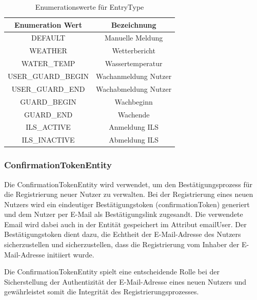 \documentclass[fontsize=12pt,openright,oneside,paper=a4,BCOR=1cm]{scrbook}
\begin{document}
\begin{table}[ht]
\centering
\caption{Enumerationswerte für \glqq EntryType\grqq{}}
\label{tab:entrytype}
\begin{tabular}{|c|c|}
\hline
Enumeration Wert & Bezeichnung \\
\hline
DEFAULT & Manuelle Meldung \\
WEATHER & Wetterbericht	 \\
WATER\_TEMP & Wassertemperatur \\
USER\_GUARD\_BEGIN & Wachanmeldung Nutzer\\
USER\_GUARD\_END & Wachabmeldung Nutzer\\
GUARD\_BEGIN & Wachbeginn\\
GUARD\_END & Wachende\\
ILS\_ACTIVE & Anmeldung ILS\\
ILS\_INACTIVE & Abmeldung ILS\\
\hline
\end{tabular}
\end{table}

\subsubsection{ConfirmationTokenEntity}
Die \glqq ConfirmationTokenEntity\grqq{} wird verwendet, um den Bestätigungsprozess für die Registrierung neuer Nutzer zu verwalten. Bei der Registrierung eines neuen Nutzers wird ein eindeutiger Bestätigungstoken (\glqq confirmationToken\grqq{}) generiert und dem Nutzer per E-Mail als Bestätigungslink zugesandt. Die verwendete Email wird dabei auch in der Entität gespeichert im Attribut \glqq emailUser\grqq{}. Der Bestätigungstoken dient dazu, die Echtheit der E-Mail-Adresse des Nutzers sicherzustellen und sicherzustellen, dass die Registrierung vom Inhaber der E-Mail-Adresse initiiert wurde.

Die \glqq ConfirmationTokenEntity\grqq{} spielt eine entscheidende Rolle bei der Sicherstellung der Authentizität der E-Mail-Adresse eines neuen Nutzers und gewährleistet somit die Integrität des Registrierungsprozesses.


\end{document}
